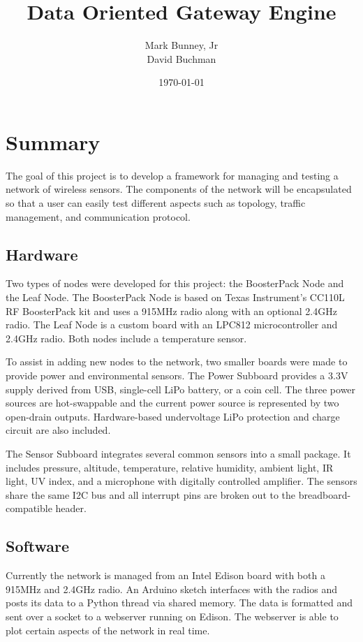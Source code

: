 \documentclass[a4paper]{article}
\title{Data Oriented Gateway Engine}
\author{Mark Bunney, Jr \\ David Buchman}
\date{\today}
\begin{document}
\maketitle

\section{Summary}

The goal of this project is to develop a framework for managing and testing a network of wireless sensors. The components of the network will be encapsulated so that a user can easily test different aspects such as topology, traffic management, and communication protocol. 

\subsection{Hardware}

Two types of nodes were developed for this project: the BoosterPack Node and the Leaf Node. The BoosterPack Node is based on Texas Instrument's CC110L RF BoosterPack kit and uses a 915MHz radio along with an optional 2.4GHz radio. The Leaf Node is a custom board with an LPC812 microcontroller and 2.4GHz radio. Both nodes include a temperature sensor.

To assist in adding new nodes to the network, two smaller boards were made to provide power and environmental sensors. The Power Subboard provides a 3.3V supply derived from USB, single-cell LiPo battery, or a coin cell. The three power sources are hot-swappable and the current power source is represented by two open-drain outputs. Hardware-based undervoltage LiPo protection and charge circuit are also included.

The Sensor Subboard integrates several common sensors into a small package. It includes pressure, altitude, temperature, relative humidity, ambient light, IR light, UV index, and a microphone with digitally controlled amplifier. The sensors share the same I2C bus and all interrupt pins are broken out to the breadboard-compatible header.

\subsection{Software}

Currently the network is managed from an Intel Edison board with both a 915MHz and 2.4GHz radio. An Arduino sketch interfaces with the radios and posts its data to a Python thread via shared memory. The data is formatted and sent over a socket to a webserver running on Edison. The webserver is able to plot certain aspects of the network in real time.
\end{document}
